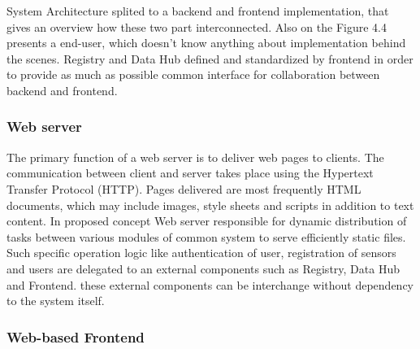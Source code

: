     System Architecture splited to a backend and frontend implementation, that gives an overview how these two part interconnected. Also on the Figure 4.4 presents a end-user, which doesn't know anything about implementation behind the scenes. Registry and Data Hub defined and standardized by frontend in order to provide as much as possible common interface for collaboration between backend and frontend. 

	\subsubsection{Web server}
  The primary function of a web server is to deliver web pages to clients. The communication between client and server takes place using the Hypertext Transfer Protocol (HTTP). Pages delivered are most frequently HTML documents, which may include images, style sheets and scripts in addition to text content. 
  \newline In proposed concept Web server responsible for dynamic distribution of tasks between various modules of common system to serve efficiently static files. Such specific operation logic like authentication of user, registration of sensors and users are delegated to an external components such as Registry, Data Hub and Frontend. these external components can be interchange without dependency to the system itself.

  \subsubsection{Web-based Frontend}
